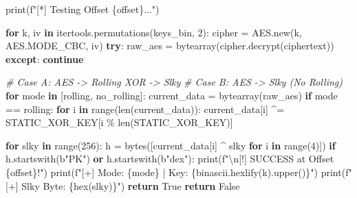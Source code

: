 \documentclass[
]{article}
\newenvironment{Shaded}{}{}
\newcommand{\BuiltInTok}[1]{\textcolor[rgb]{0.00,0.50,0.00}{#1}}
\newcommand{\CharTok}[1]{\textcolor[rgb]{0.25,0.44,0.63}{#1}}
\newcommand{\CommentTok}[1]{\textcolor[rgb]{0.38,0.63,0.69}{\textit{#1}}}
\newcommand{\ControlFlowTok}[1]{\textcolor[rgb]{0.00,0.44,0.13}{\textbf{#1}}}
\newcommand{\DecValTok}[1]{\textcolor[rgb]{0.25,0.63,0.44}{#1}}
\newcommand{\KeywordTok}[1]{\textcolor[rgb]{0.00,0.44,0.13}{\textbf{#1}}}
\newcommand{\NormalTok}[1]{#1}
\newcommand{\OperatorTok}[1]{\textcolor[rgb]{0.40,0.40,0.40}{#1}}
\newcommand{\SpecialCharTok}[1]{\textcolor[rgb]{0.25,0.44,0.63}{#1}}
\newcommand{\SpecialStringTok}[1]{\textcolor[rgb]{0.73,0.40,0.53}{#1}}
\newcommand{\StringTok}[1]{\textcolor[rgb]{0.25,0.44,0.63}{#1}}
\newcommand{\VariableTok}[1]{\textcolor[rgb]{0.10,0.09,0.49}{#1}}
\begin{document}
\begin{Shaded}
\begin{Highlighting}[]
        \BuiltInTok{print}\NormalTok{(}\SpecialStringTok{f"[*] Testing Offset }\SpecialCharTok{\{}\NormalTok{offset}\SpecialCharTok{\}}\SpecialStringTok{..."}\NormalTok{)}

        \ControlFlowTok{for}\NormalTok{ k, iv }\KeywordTok{in}\NormalTok{ itertools.permutations(keys\_bin, }\DecValTok{2}\NormalTok{):}
\NormalTok{            cipher }\OperatorTok{=}\NormalTok{ AES.new(k, AES.MODE\_CBC, iv)}
            \ControlFlowTok{try}\NormalTok{:}
\NormalTok{                raw\_aes }\OperatorTok{=} \BuiltInTok{bytearray}\NormalTok{(cipher.decrypt(ciphertext))}
            \ControlFlowTok{except}\NormalTok{:}
                \ControlFlowTok{continue}

            \CommentTok{\# Case A: AES {-}\textgreater{} Rolling XOR {-}\textgreater{} Slky}
            \CommentTok{\# Case B: AES {-}\textgreater{} Slky (No Rolling)}
            \ControlFlowTok{for}\NormalTok{ mode }\KeywordTok{in}\NormalTok{ [}\StringTok{\textquotesingle{}rolling\textquotesingle{}}\NormalTok{, }\StringTok{\textquotesingle{}no\_rolling\textquotesingle{}}\NormalTok{]:}
\NormalTok{                current\_data }\OperatorTok{=} \BuiltInTok{bytearray}\NormalTok{(raw\_aes)}
                \ControlFlowTok{if}\NormalTok{ mode }\OperatorTok{==} \StringTok{\textquotesingle{}rolling\textquotesingle{}}\NormalTok{:}
                    \ControlFlowTok{for}\NormalTok{ i }\KeywordTok{in} \BuiltInTok{range}\NormalTok{(}\BuiltInTok{len}\NormalTok{(current\_data)):}
\NormalTok{                        current\_data[i] }\OperatorTok{\^{}=}\NormalTok{ STATIC\_XOR\_KEY[i }\OperatorTok{\%} \BuiltInTok{len}\NormalTok{(STATIC\_XOR\_KEY)]}

                \ControlFlowTok{for}\NormalTok{ slky }\KeywordTok{in} \BuiltInTok{range}\NormalTok{(}\DecValTok{256}\NormalTok{):}
\NormalTok{                    h }\OperatorTok{=} \BuiltInTok{bytes}\NormalTok{([current\_data[i] }\OperatorTok{\^{}}\NormalTok{ slky }\ControlFlowTok{for}\NormalTok{ i }\KeywordTok{in} \BuiltInTok{range}\NormalTok{(}\DecValTok{4}\NormalTok{)])}
                    \ControlFlowTok{if}\NormalTok{ h.startswith(}\StringTok{b"PK"}\NormalTok{) }\KeywordTok{or}\NormalTok{ h.startswith(}\StringTok{b"dex"}\NormalTok{):}
                        \BuiltInTok{print}\NormalTok{(}\SpecialStringTok{f"}\CharTok{\textbackslash{}n}\SpecialStringTok{[!] SUCCESS at Offset }\SpecialCharTok{\{}\NormalTok{offset}\SpecialCharTok{\}}\SpecialStringTok{!"}\NormalTok{)}
                        \BuiltInTok{print}\NormalTok{(}\SpecialStringTok{f"[+] Mode: }\SpecialCharTok{\{}\NormalTok{mode}\SpecialCharTok{\}}\SpecialStringTok{ | Key: }\SpecialCharTok{\{}\NormalTok{binascii}\SpecialCharTok{.}\NormalTok{hexlify(k)}\SpecialCharTok{.}\NormalTok{upper()}\SpecialCharTok{\}}\SpecialStringTok{"}\NormalTok{)}
                        \BuiltInTok{print}\NormalTok{(}\SpecialStringTok{f"[+] Slky Byte: }\SpecialCharTok{\{}\BuiltInTok{hex}\NormalTok{(slky)}\SpecialCharTok{\}}\SpecialStringTok{"}\NormalTok{)}
                        \ControlFlowTok{return} \VariableTok{True}
    \ControlFlowTok{return} \VariableTok{False}


\end{Highlighting}
\end{Shaded}
\end{document}
